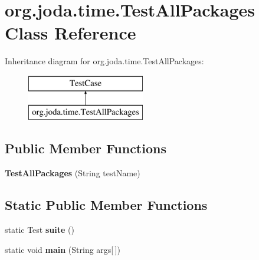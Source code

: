 \hypertarget{classorg_1_1joda_1_1time_1_1_test_all_packages}{\section{org.\-joda.\-time.\-Test\-All\-Packages Class Reference}
\label{classorg_1_1joda_1_1time_1_1_test_all_packages}
}
Inheritance diagram for org.\-joda.\-time.\-Test\-All\-Packages\-:\begin{figure}[H]
\begin{center}
\leavevmode
\includegraphics[height=2.000000cm]{classorg_1_1joda_1_1time_1_1_test_all_packages}
\end{center}
\end{figure}
\subsection*{Public Member Functions}
\begin{DoxyCompactItemize}
\item 
\hypertarget{classorg_1_1joda_1_1time_1_1_test_all_packages_aa6dfe9a6b059a61e2666073784d9c938}{{\bfseries Test\-All\-Packages} (String test\-Name)}\label{classorg_1_1joda_1_1time_1_1_test_all_packages_aa6dfe9a6b059a61e2666073784d9c938}

\end{DoxyCompactItemize}
\subsection*{Static Public Member Functions}
\begin{DoxyCompactItemize}
\item 
\hypertarget{classorg_1_1joda_1_1time_1_1_test_all_packages_a22743a6577c002f264cdc1269482643e}{static Test {\bfseries suite} ()}\label{classorg_1_1joda_1_1time_1_1_test_all_packages_a22743a6577c002f264cdc1269482643e}

\item 
\hypertarget{classorg_1_1joda_1_1time_1_1_test_all_packages_afff7a0c4385f14092c1ccfa61b83e4c6}{static void {\bfseries main} (String args\mbox{[}$\,$\mbox{]})}\label{classorg_1_1joda_1_1time_1_1_test_all_packages_afff7a0c4385f14092c1ccfa61b83e4c6}

\end{DoxyCompactItemize}


